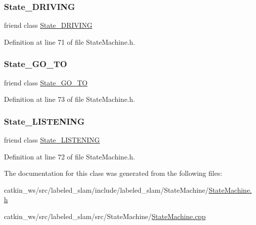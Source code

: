 \subsubsection{\texorpdfstring{State\+\_\+\+D\+R\+I\+V\+I\+NG}{State\_DRIVING}}
{\footnotesize\ttfamily friend class \hyperlink{class_state___d_r_i_v_i_n_g}{State\+\_\+\+D\+R\+I\+V\+I\+NG}\hspace{0.3cm}{\ttfamily [friend]}}



Definition at line 71 of file State\+Machine.\+h.

\mbox{\label{class_state_machine_ae1f479386d109e891cf95b71a1fa9d38}} 
\subsubsection{\texorpdfstring{State\+\_\+\+G\+O\+\_\+\+TO}{State\_GO\_TO}}
{\footnotesize\ttfamily friend class \hyperlink{class_state___g_o___t_o}{State\+\_\+\+G\+O\+\_\+\+TO}\hspace{0.3cm}{\ttfamily [friend]}}



Definition at line 73 of file State\+Machine.\+h.

\mbox{\label{class_state_machine_a6309eb5fa74ee5fdbbe99598c54aa8ef}} 
\subsubsection{\texorpdfstring{State\+\_\+\+L\+I\+S\+T\+E\+N\+I\+NG}{State\_LISTENING}}
{\footnotesize\ttfamily friend class \hyperlink{class_state___l_i_s_t_e_n_i_n_g}{State\+\_\+\+L\+I\+S\+T\+E\+N\+I\+NG}\hspace{0.3cm}{\ttfamily [friend]}}



Definition at line 72 of file State\+Machine.\+h.



The documentation for this class was generated from the following files\+:\begin{DoxyCompactItemize}
\item 
catkin\+\_\+ws/src/labeled\+\_\+slam/include/labeled\+\_\+slam/\+State\+Machine/\hyperlink{_state_machine_8h}{State\+Machine.\+h}\item 
catkin\+\_\+ws/src/labeled\+\_\+slam/src/\+State\+Machine/\hyperlink{_state_machine_8cpp}{State\+Machine.\+cpp}\end{DoxyCompactItemize}
